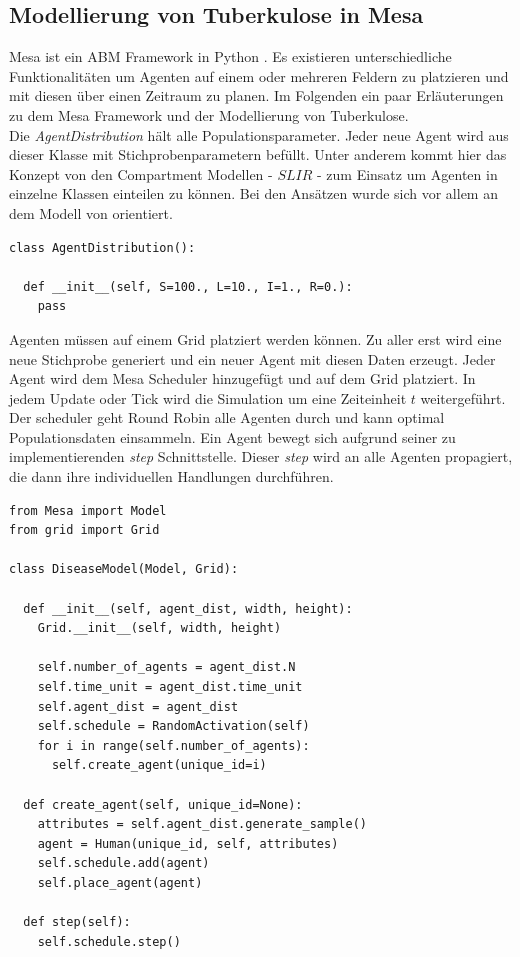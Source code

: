 \documentclass[paper=a4, fontsize=11pt, ngerman, abstract=on]{scrartcl}
\numberwithin{equation}{section} %
\numberwithin{figure}{section} %
\numberwithin{table}{section} %
\begin{document}
\subsection{Modellierung von Tuberkulose in Mesa}

Mesa ist ein ABM Framework in Python \cite{Mesa}. Es existieren unterschiedliche Funktionalitäten um Agenten auf einem oder mehreren Feldern zu platzieren und mit diesen über einen Zeitraum zu planen. Im Folgenden ein paar Erläuterungen zu dem Mesa Framework und der Modellierung von Tuberkulose. \\

Die \textit{AgentDistribution} hält alle Populationsparameter. Jeder neue Agent wird aus dieser Klasse mit Stichprobenparametern befüllt. Unter anderem kommt hier das Konzept von den Compartment Modellen - $SLIR$ - zum Einsatz um Agenten in einzelne Klassen einteilen zu können. Bei den Ansätzen wurde sich vor allem an dem Modell von \cite{Perez2009} orientiert.

\begin{lstlisting}[style=python]
class AgentDistribution():

  def __init__(self, S=100., L=10., I=1., R=0.):
    pass
\end{lstlisting}

Agenten müssen auf einem Grid platziert werden können. Zu aller erst wird eine neue Stichprobe generiert und ein neuer Agent mit diesen Daten erzeugt. Jeder Agent wird dem Mesa Scheduler hinzugefügt und auf dem Grid platziert. In jedem Update oder Tick wird die Simulation um eine Zeiteinheit $t$ weitergeführt. Der scheduler geht Round Robin alle Agenten durch und kann optimal Populationsdaten einsammeln. Ein Agent bewegt sich aufgrund seiner zu implementierenden \textit{step} Schnittstelle. Dieser \textit{step} wird an alle Agenten propagiert, die dann ihre individuellen Handlungen durchführen.

\begin{lstlisting}[style=python]
from Mesa import Model
from grid import Grid

class DiseaseModel(Model, Grid):

  def __init__(self, agent_dist, width, height):
    Grid.__init__(self, width, height)

    self.number_of_agents = agent_dist.N
    self.time_unit = agent_dist.time_unit
    self.agent_dist = agent_dist
    self.schedule = RandomActivation(self)
    for i in range(self.number_of_agents):
      self.create_agent(unique_id=i)

  def create_agent(self, unique_id=None):
    attributes = self.agent_dist.generate_sample()
    agent = Human(unique_id, self, attributes)
    self.schedule.add(agent)
    self.place_agent(agent)

  def step(self):
    self.schedule.step()
\end{lstlisting}
\end{document}
